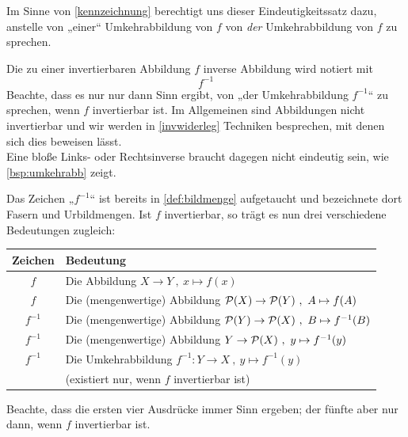 \begin{bem} \label{dieumkehrabb}
    Im Sinne von \cref{kennzeichnung} berechtigt uns dieser Eindeutigkeitssatz dazu, anstelle von „einer“ Umkehrabbildung von $f$ von \emph{der} Umkehrabbildung von $f$ zu sprechen.
    
    Die zu einer invertierbaren Abbildung $f$ inverse Abbildung wird notiert mit
        \[ f^{-1} \]
    Beachte, dass es nur nur dann Sinn ergibt, von „der Umkehrabbildung $f^{-1}$“ zu sprechen, wenn $f$ invertierbar ist. Im Allgemeinen sind Abbildungen nicht invertierbar und wir werden in \cref{invwiderleg} Techniken besprechen, mit denen sich dies beweisen lässt. \\[0.5em]
    Eine bloße Links- oder Rechtsinverse braucht dagegen nicht eindeutig sein, wie \cref{bsp:umkehrabb} zeigt.
\end{bem}


\begin{bem}
    Das Zeichen „$f^{-1}$“ ist bereits in \cref{def:bildmenge} aufgetaucht und bezeichnete dort Fasern und Urbildmengen. Ist $f$ invertierbar, so trägt es nun drei verschiedene Bedeutungen zugleich:
    \begin{center}
    \begin{tabular}{cl}
        Zeichen & Bedeutung \\
        \midrule
        $f$ & Die Abbildung $X \to Y \ ,\ x \mapsto f(x)$ \\
        $f$ & Die (mengenwertige) Abbildung $\mathcal P(X) \to \mathcal P(Y) \ ,\ A\mapsto f(A)$  \\
        $f^{-1}$ & Die (mengenwertige) Abbildung $\mathcal P(Y) \to \mathcal P(X) \ ,\ B\mapsto f^{-1}(B)$ \\
        $f^{-1}$ & Die (mengenwertige) Abbildung $Y \to \mathcal P(X) \ ,\ y\mapsto f^{-1}(y)$ \\
        \midrule
        $f^{-1}$ & Die Umkehrabbildung $f^{-1} : Y\to X \ ,\ y \mapsto f^{-1}(y)$ \\
        & (existiert nur, wenn $f$ invertierbar ist)
    \end{tabular}
    \end{center}
    Beachte, dass die ersten vier Ausdrücke immer Sinn ergeben; der fünfte aber nur dann, wenn $f$ invertierbar ist.
\end{bem}


